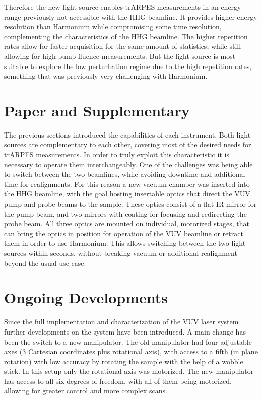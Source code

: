 Therefore the new light source enables trARPES measurements in an energy range previously not accessible with the HHG beamline.
It provides higher energy resolution than Harmonium while compromising some time resolution, complementing the characteristics of the HHG beamline.
The higher repetition rates allow for faster acquisition for the same amount of statistics, while still allowing for high pump fluence measurements.
But the light source is most suitable to explore the low perturbation regime due to the high repetition rates, something that was previously very challenging with Harmonium.

\section{Paper and Supplementary}

The previous sections introduced the capabilities of each instrument.
Both light sources are complementary to each other, covering most of the desired needs for trARPES measurements.
In order to truly exploit this characteristic it is necessary to operate them interchangeably. 
One of the challenges was being able to switch between the two beamlines, while avoiding downtime and additional time for realignments.
For this reason a new vacuum chamber was inserted into the HHG beamline, with the goal hosting insertable optics that direct the VUV pump and probe beams to the sample.
These optics consist of a flat IR mirror for the pump beam, and two  mirrors with  coating for focusing and redirecting the probe beam.
All three optics are mounted on individual, motorized stages, that can bring the optics in position for operation of the VUV beamline or retract them in order to use Harmonium.
This allows switching between the two light sources within seconds, without breaking vacuum or additional realignment beyond the usual use case.




\section{Ongoing Developments}

Since the full implementation and characterization of the VUV laser system further developments on the system have been introduced.
A main change has been the switch to a new manipulator.
The old manipulator had four adjustable axes (3 Cartesian coordinates plus rotational axis), with access to a fifth (in plane rotation) with low accuracy by rotating the sample with the help of a wobble stick.
In this setup only the rotational axis was motorized.
The new manipulator has access to all six degrees of freedom, with all of them being motorized, allowing for greater control and more complex scans.

